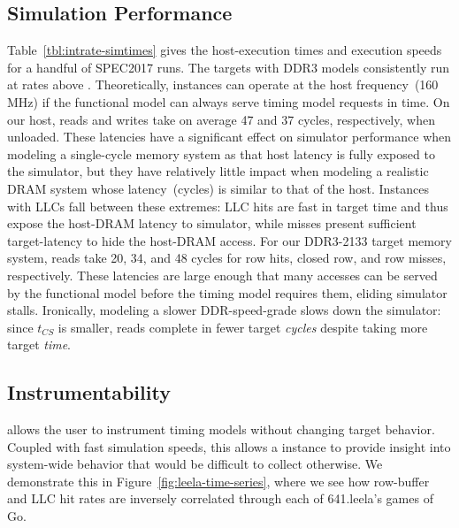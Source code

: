 \vspace{-0.05in}
\subsection{Simulation Performance}



Table~\ref{tbl:intrate-simtimes} gives the
host-execution times and execution speeds for a handful of SPEC2017 runs. The
targets with DDR3 models consistently run at rates above . Theoretically,
\PNAME instances can operate at the host frequency~(160 MHz) if the functional model can always serve timing model requests in time.
On our host, reads and writes take on average 47
and 37 cycles, respectively, when unloaded.  These latencies have
a significant effect on simulator performance when modeling a single-cycle memory
system as that host latency is fully exposed to the simulator, but
they have relatively little impact
when modeling a realistic DRAM system
whose latency~(cycles) is similar to that of the host.
Instances with LLCs fall between these extremes: LLC hits are fast in
target time and thus expose the host-DRAM latency to simulator, while
misses present sufficient target-latency to hide the host-DRAM access.
For our DDR3-2133 target memory system, reads take 20, 34, and 48 cycles for
row hits, closed row, and row misses, respectively. These latencies are large enough that many accesses can be
served by the functional model before the timing model requires them, eliding simulator stalls.
Ironically, modeling a slower DDR-speed-grade slows down the simulator: since $t_{CS}$ is smaller, reads complete in fewer target
\emph{cycles} despite taking more target \emph{time}.

\vspace{-0.05in}
\subsection{Instrumentability}
\PNAME allows the user to instrument timing models without changing target
behavior. Coupled with fast simulation speeds, this allows a \PNAME instance to
provide insight into system-wide behavior that would be difficult to collect
otherwise. We demonstrate this in Figure~\ref{fig:leela-time-series}, where we
see how row-buffer and LLC hit rates are inversely correlated through each of
641.leela's games of Go.


